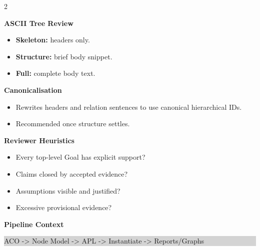 \documentclass[10pt,letterpaper]{article}
\newcommand{\Sec}[1]{%
  \vspace{5pt}%
  \noindent{\color{RuleGray}\rule{\linewidth}{0.35pt}}\par
  \vspace{2pt}%
  {\bfseries #1}\par
  \vspace{2pt}%
}
\newcommand{\Example}[1]{%
  \vspace{1pt}%
  \noindent\colorbox{LightGray}{%
    \parbox{\linewidth}{\ttfamily\footnotesize\raggedright
#1
    }%
  }%
  \vspace{2pt}%
}
\begin{document}
\begin{multicols*}{2}
\columnbreak

\Sec{ASCII Tree Review}
\begin{itemize}
  \item \textbf{Skeleton:} headers only.
  \item \textbf{Structure:} brief body snippet.
  \item \textbf{Full:} complete body text.
\end{itemize}

\Sec{Canonicalisation}
\begin{itemize}
  \item Rewrites headers and relation sentences to use canonical hierarchical IDs.
  \item Recommended once structure settles.
\end{itemize}

\Sec{Reviewer Heuristics}
\begin{itemize}
  \item Every top-level Goal has explicit support?
  \item Claims closed by accepted evidence?
  \item Assumptions visible and justified?
  \item Excessive provisional evidence?
\end{itemize}

\Sec{Pipeline Context}
\Example{ACO -> Node Model -> APL -> Instantiate -> Reports/Graphs}

\end{multicols*}
\end{document}
